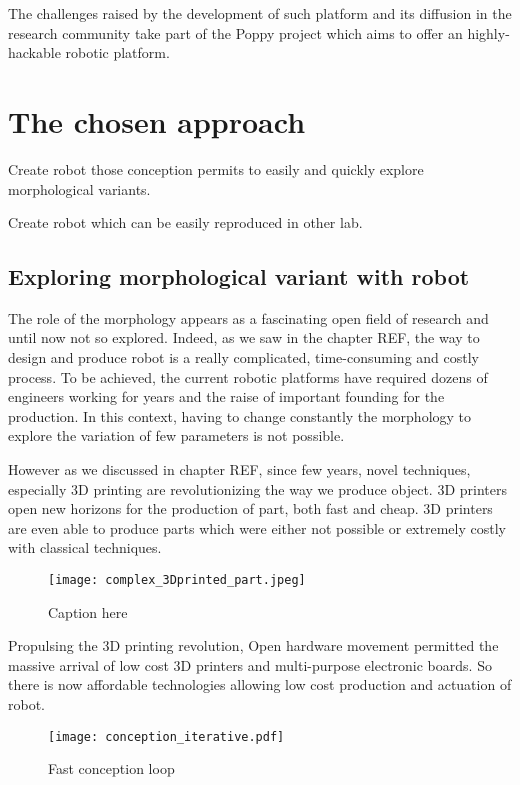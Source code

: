 The challenges raised by the development of such platform and its diffusion in the research community take part of the Poppy project which aims to offer an highly-hackable robotic platform.

\section{The chosen approach} %

Create robot those conception permits to easily and quickly explore morphological variants.

Create robot which can be easily reproduced in other lab.

\subsection{Exploring morphological variant with robot} %

The role of the morphology appears as a fascinating open field of research and until now not so explored. Indeed, as we saw in the chapter REF, the way to design and produce robot is a really complicated, time-consuming and costly process. To be achieved, the current robotic platforms have required dozens of engineers working for years and the raise of important founding for the production. In this context, having to change constantly the morphology to explore the variation of few parameters is not possible.

However as we discussed in chapter REF, since few years, novel techniques, especially 3D printing are revolutionizing the way we produce object. 3D printers open new horizons for the production of part, both fast and cheap. 3D printers are even able to produce parts which were either not possible or extremely costly with classical techniques.

\begin{figure}[]
    \begin{center}
        \texttt{[image: complex\_3Dprinted\_part.jpeg]}
    \end{center}
    \caption{Caption here}
    \label{fig:figure1}
\end{figure}

Propulsing the 3D printing revolution, Open hardware movement permitted the massive arrival of low cost 3D printers and multi-purpose electronic boards. So there is now affordable technologies allowing low cost production and actuation of robot.

\begin{figure}[]
    \begin{center}
        \texttt{[image: conception\_iterative.pdf]}
    \end{center}
    \caption{Fast conception loop}
    \label{fig:conception_loop}
\end{figure}

